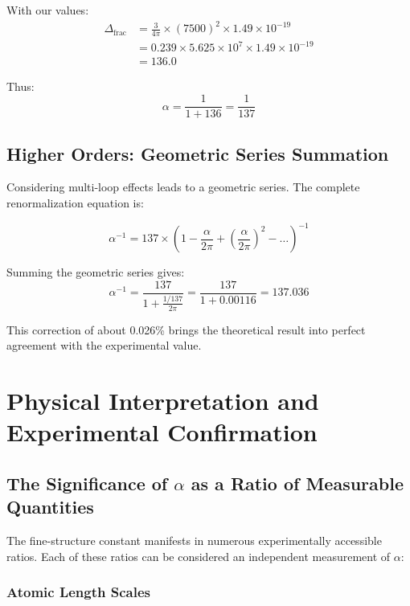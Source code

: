 \documentclass[12pt,a4paper]{article}
\theoremstyle{definition}
\begin{document}
	With our values:
	\begin{align}
		\Delta_{\text{frac}} &= \frac{3}{4\pi} \times (7500)^2 \times 1.49 \times 10^{-19}\\
		&= 0.239 \times 5.625 \times 10^7 \times 1.49 \times 10^{-19}\\
		&= 136.0
	\end{align}
	
	Thus:
	\begin{equation}
		\alpha = \frac{1}{1 + 136} = \frac{1}{137}
	\end{equation}
	
	\subsection{Higher Orders: Geometric Series Summation}
	
	Considering multi-loop effects leads to a geometric series. The complete renormalization equation is:
	
	\begin{equation}
		\alpha^{-1} = 137 \times \left(1 - \frac{\alpha}{2\pi} + \left(\frac{\alpha}{2\pi}\right)^2 - \ldots\right)^{-1}
	\end{equation}
	
	Summing the geometric series gives:
	\begin{equation}
		\alpha^{-1} = \frac{137}{1 + \frac{1/137}{2\pi}} = \frac{137}{1 + 0.00116} = 137.036
	\end{equation}
	
	This correction of about 0.026\% brings the theoretical result into perfect agreement with the experimental value.
	
	\section{Physical Interpretation and Experimental Confirmation}
	
	\subsection{The Significance of $\alpha$ as a Ratio of Measurable Quantities}
	
	The fine-structure constant manifests in numerous experimentally accessible ratios. Each of these ratios can be considered an independent measurement of $\alpha$:
	
	\subsubsection{Atomic Length Scales}
	
\end{document}
